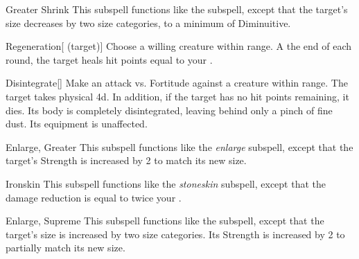 \begin{ability}[\nth{4}]{Greater Shrink}
This subspell functions like the  subspell, except that the target's size decreases by two size categories, to a minimum of Diminuitive.
\end{ability}
\vspace{0.25em}



\begin{ability}[\nth{4}]{Regeneration}[ (target)]
Choose a willing creature within \rngclose range.
A the end of each round, the target heals hit points equal to your .
\end{ability}
\vspace{0.25em}



\begin{ability}[\nth{5}]{Disintegrate}[]
Make an attack vs. Fortitude against a creature within \rngmed range.
\hit The target takes physical  \plus4d.
In addition, if the target has no hit points remaining, it dies.
Its body is completely disintegrated, leaving behind only a pinch of fine dust.
Its equipment is unaffected.
\end{ability}
\vspace{0.25em}



\begin{ability}[\nth{5}]{Enlarge, Greater}
This subspell functions like the \textit{enlarge} subspell, except that the target's Strength is increased by 2 to match its new size.
\end{ability}
\vspace{0.25em}



\begin{ability}[\nth{6}]{Ironskin}
This subspell functions like the \textit{stoneskin} subspell, except that the damage reduction is equal to twice your .
\end{ability}
\vspace{0.25em}



\begin{ability}[\nth{7}]{Enlarge, Supreme}
This subspell functions like the  subspell, except that the target's size is increased by two size categories.
Its Strength is increased by 2 to partially match its new size.
\end{ability}
\vspace{0.25em}



